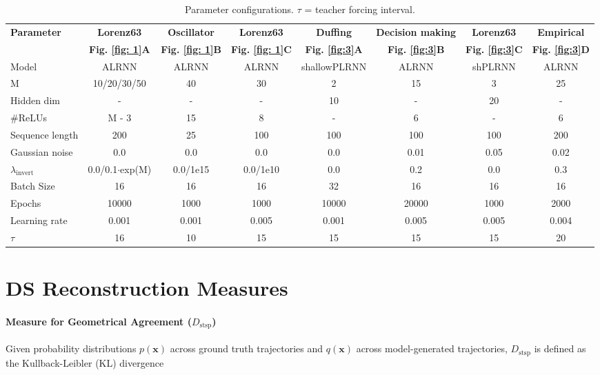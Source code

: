 \documentclass{article}
\theoremstyle{example}
\theoremstyle{plain}
\theoremstyle{definition}
\theoremstyle{remark}
\def\vx{{\bm{x}}}
\begin{document}
\begin{table}[htbp]
\centering
\scriptsize
\begin{tabular}{l c c c c c c c}
\hline
\textbf{Parameter} & \textbf{Lorenz63} & \textbf{Oscillator} & \textbf{Lorenz63} & \textbf{Duffing} & \textbf{Decision making} & \textbf{Lorenz63} & \textbf{Empirical} \\
\textbf{} & \textbf{Fig. \ref{fig: 1}A} & \textbf{Fig. \ref{fig: 1}B} & \textbf{Fig. \ref{fig: 1}C} & \textbf{Fig. \ref{fig:3}A} & \textbf{Fig. \ref{fig:3}B} & \textbf{Fig. \ref{fig:3}C} & \textbf{Fig. \ref{fig:3}D} \\
\hline
Model & ALRNN & ALRNN & ALRNN & shallowPLRNN & ALRNN & shPLRNN & ALRNN \\
M & 10/20/30/50 & 40 & 30 & 2 & 15 & 3 & 25 \\
Hidden dim & - & - & - & 10 & - & 20 & - \\
\#ReLUs & M - 3 & 15 & 8 & - & 6 & - & 6 \\
Sequence length & 200 & 25 & 100 & 100 & 100 & 100 & 200 \\
Gaussian noise & 0.0 & 0.0 & 0.0 & 0.0 & 0.01 & 0.05 & 0.02 \\
$\lambda_\text{invert}$
% 
& 0.0/0.1$\cdot$exp(M) & 0.0/1e15 & 0.0/1e10 & 0.0 & 0.2 & 0.0 & 0.3 \\
Batch Size & 16 & 16 & 16 & 32 & 16 & 16 & 16 \\
Epochs & 10000 & 1000 & 1000 & 10000 & 20000 & 1000 & 2000 \\
Learning rate & 0.001 & 0.001 & 0.005 & 0.001 & 0.005 & 0.005 & 0.004 \\
$\tau$ & 16 & 10 & 15 & 15 & 15 & 15 & 20 \\
\end{tabular}
\caption{Parameter configurations. $\tau$ = teacher forcing interval.}
\label{tab:experiment-configs}
\end{table}

\section{DS Reconstruction Measures}
\label{sec:Dstsp}

\paragraph{Measure for Geometrical Agreement (\(D_{\text{stsp}}\))}

Given  probability distributions \( p(\vx) \) across ground truth trajectories and \( q(\vx) \) across model-generated trajectories, $D_{\text{stsp}}$ is defined as the Kullback-Leibler (KL) divergence
\end{document}
